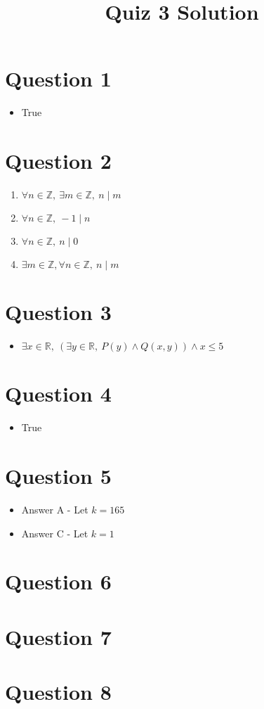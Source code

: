 \documentclass[12pt]{article}
\begin{document}
\title{Quiz 3 Solution}
\maketitle

\section*{Question 1}
\begin{itemize}
    \item True

\end{itemize}

\section*{Question 2}
\begin{enumerate}
    \item $\forall n \in \mathbb{Z},\: \exists m \in \mathbb{Z},\: n \mid m$
    \item $\forall n \in \mathbb{Z},\: -1 \mid n$
    \item $\forall n \in \mathbb{Z},\: n \mid 0$
    \item $\exists m \in \mathbb{Z}, \forall n \in \mathbb{Z},\: n \mid m$
\end{enumerate}

\section*{Question 3}
\begin{itemize}
    \item $\exists x \in \mathbb{R},\:(\exists y \in \mathbb{R},\:P(y) \land Q(x,y)) \land x \leq 5$
\end{itemize}

\section*{Question 4}
\begin{itemize}
    \item True
\end{itemize}

\section*{Question 5}
\begin{itemize}
    \item Answer A - Let $k = 165$
    \item Answer C - Let $k = 1$
\end{itemize}

\section*{Question 6}

\section*{Question 7}

\section*{Question 8}
\end{document}
